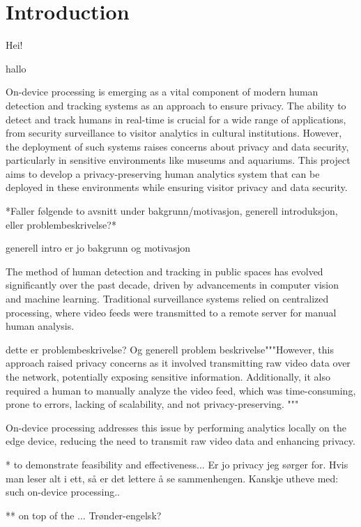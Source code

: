\section{Introduction}

Hei!

hallo

On-device processing is emerging as a vital component of modern human detection and tracking systems as an approach to ensure privacy. The ability to detect and track humans in real-time is crucial for a wide range of applications, from security surveillance to visitor analytics in cultural institutions. However, the deployment of such systems raises concerns about privacy and data security, particularly in sensitive environments like museums and aquariums. This project aims to develop a privacy-preserving human analytics system that can be deployed in these environments while ensuring visitor privacy and data security.

*Faller følgende to avsnitt under bakgrunn/motivasjon, generell introduksjon, eller problembeskrivelse?*

generell intro er jo bakgrunn og motivasjon

The method of human detection and tracking in public spaces has evolved significantly over the past decade, driven by advancements in computer vision and machine learning. Traditional surveillance systems relied on centralized processing, where video feeds were transmitted to a remote server for manual human analysis. 

dette er problembeskrivelse? Og generell problem beskrivelse"""However, this approach raised privacy concerns as it involved transmitting raw video data over the network, potentially exposing sensitive information. Additionally, it also required a human to manually analyze the video feed, which was time-consuming, prone to errors, lacking of scalability, and not privacy-preserving. """

On-device processing addresses this issue by performing analytics locally on the edge device, reducing the need to transmit raw video data and enhancing privacy.  

* to demonstrate feasibility and effectiveness... Er jo privacy jeg sørger for. Hvis man leser alt i ett, så er det lettere å se sammenhengen. Kanskje utheve med: such on-device processing..

** on top of the ... Trønder-engelsk?

